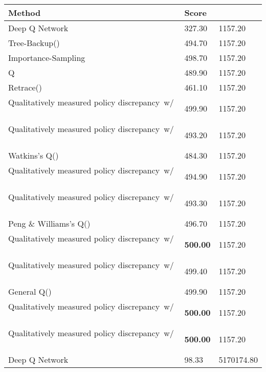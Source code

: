 \documentclass[review,english]{elsarticle}
\begin{document}
\begin{table}[p]
    \begin{tabularx}{1\linewidth}{|X|l|l|} \hline
    \textbf{Method}                  & \textbf{Score} &   \\ \hline
    Deep Q Network {\cite{meng_qualitative_2019}}            & 327.30 & 1157.20 \\
    Tree-Backup()\ {\cite{meng_qualitative_2019}}          & 494.70 & 1157.20   \\
    Importance-Sampling {\cite{meng_qualitative_2019}}             & 498.70 & 1157.20     \\
    Q {\cite{meng_qualitative_2019}}             & 489.90 & 1157.20       \\
    Retrace()\ {\cite{meng_qualitative_2019}}     & 461.10 & 1157.20         \\
    Qualitatively measured policy discrepancy\  w/ \ \ {\cite{meng_qualitative_2019}}      & 499.90 & 1157.20           \\
    Qualitatively measured policy discrepancy\  w/ \ \ {\cite{meng_qualitative_2019}}      & 493.20 & 1157.20             \\
    Watkins’s Q()\ {\cite{meng_qualitative_2019}} & 484.30 & 1157.20               \\
    Qualitatively measured policy discrepancy\  w/ \ \ {\cite{meng_qualitative_2019}}      & 494.90 & 1157.20\\
    Qualitatively measured policy discrepancy\  w/ \ \ {\cite{meng_qualitative_2019}}      & 493.30 & 1157.20\\
    Peng \& Williams’s Q()\ {\cite{meng_qualitative_2019}}    & 496.70 & 1157.20\\
    Qualitatively measured policy discrepancy\  w/ \ \ {\cite{meng_qualitative_2019}}      & \textbf{500.00}  & 1157.20\\
    Qualitatively measured policy discrepancy\  w/ \ \ {\cite{meng_qualitative_2019}}      & 499.40 & 1157.20\\
    General Q()\ {\cite{meng_qualitative_2019}}   & 499.90 & 1157.20\\
    Qualitatively measured policy discrepancy\  w/ \ \ {\cite{meng_qualitative_2019}}      & \textbf{500.00}  & 1157.20\\
    Qualitatively measured policy discrepancy\  w/ \ \ {\cite{meng_qualitative_2019}}      & \textbf{500.00}  & 1157.20\\
    Deep Q Network {\cite{xuan_bayesian_2018}}            & 98.33 & 5170174.80 \\

\end{tabularx}
\end{table}
\end{document}
